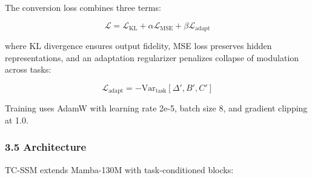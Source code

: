 The conversion loss combines three terms:

$$\mathcal{L} = \mathcal{L}_{\text{KL}} + \alpha \mathcal{L}_{\text{MSE}} + \beta \mathcal{L}_{\text{adapt}}$$

where KL divergence ensures output fidelity, MSE loss preserves hidden representations, and an adaptation regularizer penalizes collapse of modulation across tasks:

$$\mathcal{L}_{\text{adapt}} = -\text{Var}_{\text{task}}[\Delta', B', C']$$

Training uses AdamW with learning rate 2e-5, batch size 8, and gradient clipping at 1.0.

\subsubsection{3.5 Architecture}

TC-SSM extends Mamba-130M with task-conditioned blocks:

\begin{table}[htbp]
\centering
{}
\end{table}

